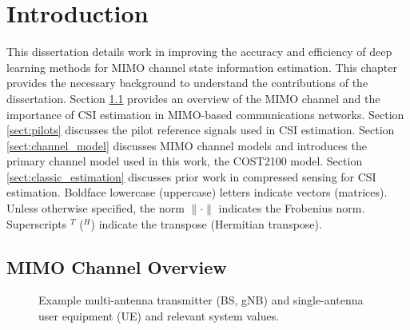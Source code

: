 \chapter{Introduction}
\label{chap:intro}


This dissertation details work in improving the accuracy and efficiency of deep learning methods for MIMO channel state information estimation. This chapter provides the necessary background to understand the contributions of the dissertation. Section \ref{sect:mimo_model} provides an overview of the MIMO channel and the importance of CSI estimation in MIMO-based communications networks. Section \ref{sect:pilots} discusses the pilot reference signals used in CSI estimation. Section \ref{sect:channel_model} discusses MIMO channel models and introduces the primary channel model used in this work, the COST2100 model. Section \ref{sect:classic_estimation} discusses prior work in compressed sensing for CSI estimation.  
Boldface lowercase (uppercase) letters indicate vectors (matrices). Unless otherwise specified, the norm $\|\cdot\|$ indicates the Frobenius norm. Superscripts $^T$ ($^H$) indicate the transpose (Hermitian transpose).

\section{MIMO Channel Overview}
\label{sect:mimo_model}

\begin{figure}[!hbtp]
\centering
{
	\fontsize{6pt}{8pt}
	\def\svgwidth{0.8\columnwidth}
	
}
\caption{Example multi-antenna transmitter (BS, gNB) and single-antenna user equipment (UE) and relevant system values.}
\label{fig:mimo_schematic}
\end{figure}

